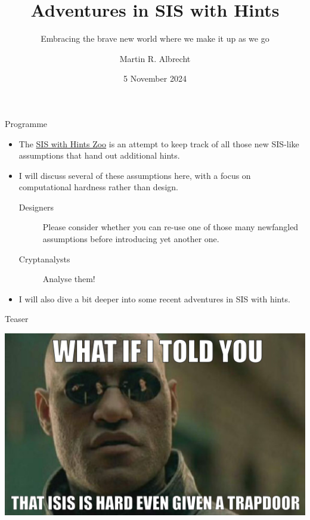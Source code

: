 \documentclass[xcolor=table,10pt,aspectratio=169]{beamer}
\author{Martin R. Albrecht}
\date{5 November 2024}
\title{Adventures in SIS with Hints}
\subtitle{Embracing the brave new world where we make it up as we go}
\begin{document}
\maketitle

\begin{frame}[label={sec:orgd0ecb85}]{Programme}
\begin{itemize}
\item The \href{https://malb.io/sis-with-hints.html}{SIS with Hints Zoo} is an attempt to keep track of all those new SIS-like assumptions that hand out additional hints.

\item I will discuss several of these assumptions here, with a focus on computational hardness rather than design.

\begin{description}
\item[{Designers}] Please consider whether you can re-use one of those many newfangled assumptions before introducing yet another one.

\item[{Cryptanalysts}] Analyse them!
\end{description}

\item I will also dive a bit deeper into some recent adventures in SIS with hints.
\end{itemize}
\end{frame}

\begin{frame}[label={sec:orge2944ae}]{Teaser}
\begin{center}
\includegraphics[keepaspectratio,height=.9\textheight]{./sis-with-hints-teaser.jpg}
\end{center}
\end{frame}
\end{document}
